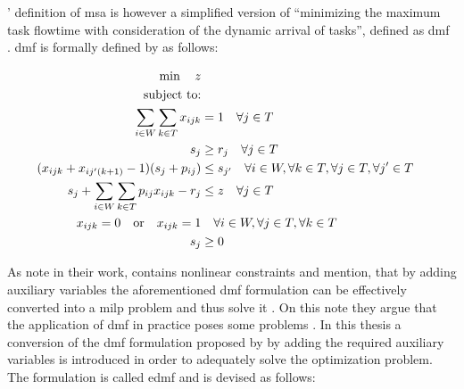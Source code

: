 \citet{Zeng2005}' definition of \gls{msa} is however a simplified version of ``minimizing the maximum task flowtime with consideration of the dynamic arrival of tasks'', defined as \gls{dmf} \citep{Baker1974,Zeng2005}. \gls{dmf} is formally defined by \citet{Zeng2005} as follows:

\begin{align}
    \min \quad z \notag \\
    \text{subject to:} \notag \\
    \sum_{i \in W} \sum_{k \in T} x_{ijk} &= 1 \quad \forall j \in T \notag \\
    s_j &\geq r_j \quad \forall j \in T \notag \\
    (x_{ijk} + x_{ij'(k+1)} - 1)(s_j + p_{ij}) &\leq s_{j'} \quad \forall i \in W, \forall k \in T, \forall j \in T, \forall j' \in T \label{eq:nonlinear_constraints_dmf}\\
    s_j + \sum_{i \in W} \sum_{k \in T} p_{ij} x_{ijk} - r_j &\leq z \quad \forall j \in T \notag \\
    x_{ijk} = 0 \quad \text{or} \quad x_{ijk} = 1 &\quad \forall i \in W, \forall j \in T, \forall k \in T \notag \\
    s_j &\geq 0 \notag 
\end{align}

As \citet{Zeng2005} note in their work,  contains nonlinear constraints and mention, that by adding auxiliary variables the aforementioned \gls{dmf} formulation can be effectively converted into a \gls{milp} problem and thus solve it \citep[p. 6]{Zeng2005}. On this note they argue that the application of \gls{dmf} in practice poses some problems \citep{Zeng2005}. In this thesis a conversion of the \gls{dmf} formulation proposed by \citet{Zeng2005} by adding the required auxiliary variables is introduced in order to adequately solve the optimization problem. The formulation is called \gls{edmf} and is devised as follows:

